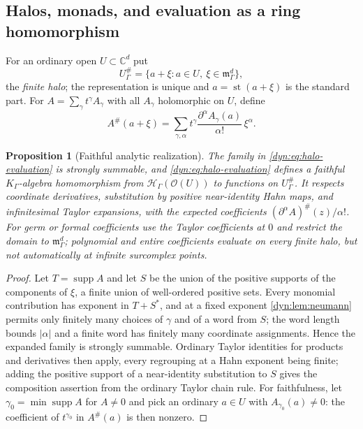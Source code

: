\documentclass[11pt,letterpaper]{article}
\newtheorem{proposition}[proposition]{Proposition}
\theoremstyle{definition}
\theoremstyle{remark}
\newcommand{\C}{\mathbb C}
\newcommand{\HH}{\mathscr H}
\newcommand{\OO}{\mathcal O}
\newcommand{\m}{\mathfrak m}
\newcommand{\supp}{\operatorname{supp}}
\newcommand{\st}{\operatorname{st}}
\numberwithin{equation}{section}
\begin{document}
\subsection{Halos, monads, and evaluation as a ring homomorphism}
\label{dyn:subsec:halo}

For an ordinary open $U\subset\C^{d}$ put
\[
 U^{\#}_\Gamma=\{a+\xi:a\in U,\ \xi\in\m_\Gamma^{d}\},
\]
the \emph{finite halo}; the representation is unique and $a=\st(a+\xi)$ is
the standard part. For $A=\sum_\gamma t^{\gamma}A_\gamma$ with all
$A_\gamma$ holomorphic on $U$, define
\begin{equation}\label{dyn:eq:halo-evaluation}
 A^{\#}(a+\xi)=\sum_{\gamma,\alpha}t^{\gamma}
 \frac{\partial^{\alpha}A_\gamma(a)}{\alpha!}\,\xi^{\alpha}.
\end{equation}

\begin{proposition}[Faithful analytic realization]\label{dyn:prop:eval}
The family in \eqref{dyn:eq:halo-evaluation} is strongly summable, and
\eqref{dyn:eq:halo-evaluation} defines a \emph{faithful} $K_\Gamma$-algebra
homomorphism from $\HH_\Gamma(\OO(U))$ to functions on $U^{\#}_\Gamma$. It
respects coordinate derivatives, substitution by positive near-identity
Hahn maps, and infinitesimal Taylor expansions, with the expected
coefficients $(\partial^{\alpha}A)^{\#}(z)/\alpha!$. For germ or formal
coefficients use the Taylor coefficients at $0$ and restrict the domain to
$\m_\Gamma^{d}$; polynomial and entire coefficients evaluate on every
finite halo, but not automatically at infinite surcomplex points.
\end{proposition}
\begin{proof}
Let $T=\supp A$ and let $S$ be the union of the positive supports of the
components of $\xi$, a finite union of well-ordered positive sets. Every
monomial contribution has exponent in $T+S^{*}$, and at a fixed exponent
\cref{dyn:lem:neumann} permits only finitely many choices of $\gamma$ and
of a word from $S$; the word length bounds $|\alpha|$ and a finite word has
finitely many coordinate assignments. Hence the expanded family is
strongly summable. Ordinary Taylor identities for products and derivatives
then apply, every regrouping at a Hahn exponent being finite; adding the
positive support of a near-identity substitution to $S$ gives the
composition assertion from the ordinary Taylor chain rule. For
faithfulness, let $\gamma_0=\min\supp A$ for $A\ne0$ and pick an ordinary
$a\in U$ with $A_{\gamma_0}(a)\ne0$: the coefficient of $t^{\gamma_0}$ in
$A^{\#}(a)$ is then nonzero.
\end{proof}
\end{document}
